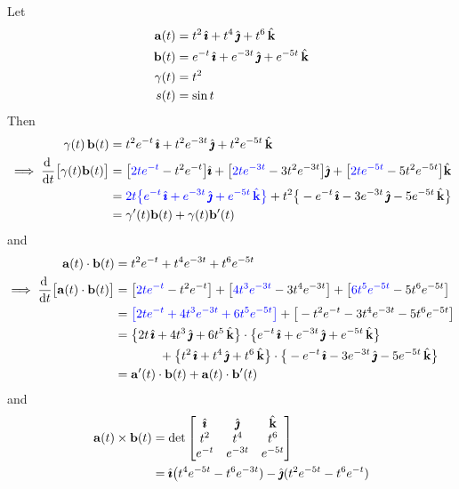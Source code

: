 \begin{eg}\label{eg:diffDot}
Let
\begin{align*}
\mathbf{a}(t)&= t^2\,\hat{\pmb{\imath}} + t^4\,\hat{\pmb{\jmath}} + t^6\,\hat{\mathbf{k}}
\\
\mathbf{b}(t)&= e^{-t}\,\hat{\pmb{\imath}} + e^{-3t}\,\hat{\pmb{\jmath}} + e^{-5t}\,\hat{\mathbf{k}}
\\
\gamma(t)&= t^2
\\
s(t)&= \sin t
\end{align*}
Then
\begin{align*}
\ga(t)\,\vb(t) & = t^2e^{-t}\,\hi + t^2 e^{-3t}\,\hj + t^2 e^{-5t}\,\hk
\\
\implies \diff{}{t}\big[\ga(t)\vb(t)\big]
&=\big[\textcolor{blue}{2t e^{-t}}-t^2e^{-t}\big]\hi
  +\big[\textcolor{blue}{2t e^{-3t}}-3t^2e^{-3t}\big]\hj
  +\big[\textcolor{blue}{2t e^{-5t}}-5t^2e^{-5t}\big]\hk
\\
&=\textcolor{blue}{2t\big\{e^{-t}\,\hi + e^{-3t}\,\hj + e^{-5t}\,\hk\big\}}
+ t^2\big\{-e^{-t}\,\hi -3 e^{-3t}\,\hj -5 e^{-5t}\,\hk\big\}
\\
&=\ga'(t)\vb(t)+\ga(t)\vb'(t)
\end{align*}
and 
\begin{align*}
\va(t)\cdot\vb(t) & = t^2e^{-t} + t^4 e^{-3t} + t^6 e^{-5t}
\\
\implies \diff{}{t}\big[\va(t)\cdot\vb(t)\big]
&=\big[\textcolor{blue}{2t e^{-t}}-t^2e^{-t}\big]
  +\big[\textcolor{blue}{4t^3 e^{-3t}}-3t^4e^{-3t}\big]
  +\big[\textcolor{blue}{6t^5 e^{-5t}}-5t^6e^{-5t}\big]
\\
&=\textcolor{blue}{\big[2t e^{-t}+4t^3 e^{-3t}+6t^5 e^{-5t}\big]}
  +\big[-t^2e^{-t}-3t^4e^{-3t}-5t^6e^{-5t}\big]
\\
&=\big\{2t\,\hi+4t^3\,\hj+6t^5\,\hk\big\}\cdot
           \big\{e^{-t}\,\hi + e^{-3t}\,\hj + e^{-5t}\,\hk\big\}\\&\hskip0.5in
  +\big\{t^2\,\hi + t^4\,\hj + t^6\,\hk\big\}\cdot
         \big\{-e^{-t}\,\hi-3e^{-3t}\,\hj-5e^{-5t}\,\hk\big\}
\\
&=\va'(t)\cdot\vb(t)+\va(t)\cdot\vb'(t)
\end{align*}
and
\begin{align*}
\va(t)\times\vb(t) 
&=\det\left[\begin{matrix}\hi& \hj &\hk\\ 
                            t^2 & t^4 & t^6\\ 
                            e^{-t} & e^{-3t} & e^{-5t}\end{matrix}\right] \\
&=\hi\big(t^4 e^{-5t}-t^6 e^{-3t}) 
  -\hj(t^2 e^{-5t}- t^6 e^{-t}) 

\end{align*}
\end{eg}
